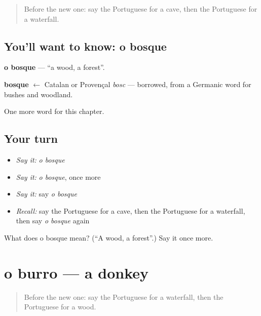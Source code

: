 \label{lesson:PT-C117-bosque}



\begin{quote}
Before the new one: say the Portuguese for a cave, then the Portuguese for a waterfall.
\end{quote}

\subsection*{You'll want to know: o bosque}
\textbf{o bosque} — \textquotedblleft{}a wood, a forest\textquotedblright{}.

\begin{cousinweb}
\textbf{bosque} $\leftarrow$ Catalan or Provençal \emph{bosc} — borrowed, from a Germanic word for bushes and woodland.
\end{cousinweb}

\begin{grammarlens}[title={What you've built}]
One more word for this chapter.
\end{grammarlens}

\subsection*{Your turn}
\begin{itemize}
\raggedright
  \item \emph{Say it:} \emph{o bosque}
  \item \emph{Say it:} \emph{o bosque}, once more
  \item \emph{Say it:} say \emph{o bosque}
  \item \emph{Recall:} say the Portuguese for a cave, then the Portuguese for a waterfall, then say \emph{o bosque} again
\end{itemize}

\begin{tcolorbox}[breakable,colback=teal!4,colframe=teal!35!black,title={Before you move on}]
What does o bosque mean? (\textquotedblleft{}A wood, a forest\textquotedblright{}.) Say it once more.
\end{tcolorbox}
\section[o burro]{o burro — a donkey}

\label{lesson:PT-C117-burro}



\begin{quote}
Before the new one: say the Portuguese for a waterfall, then the Portuguese for a wood.
\end{quote}

